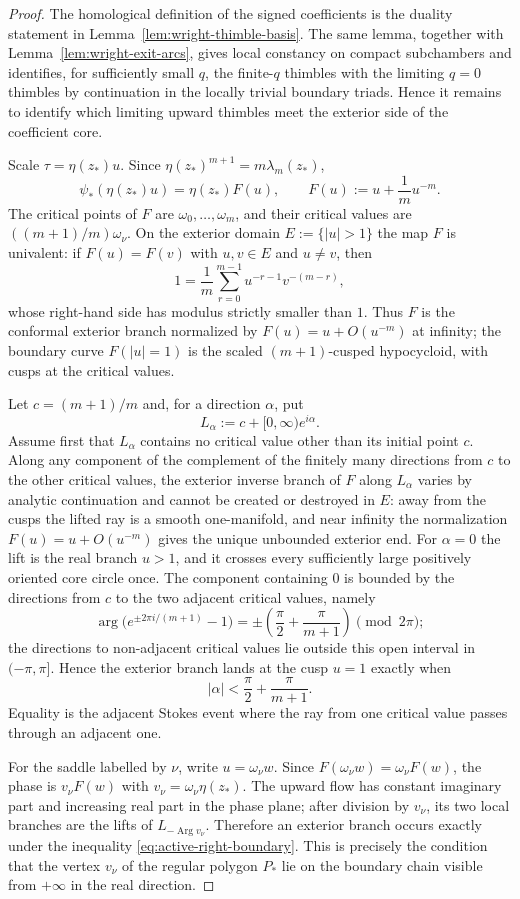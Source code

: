 \documentclass[reqno]{article}
\theoremstyle{definition}
\theoremstyle{remark}
\theoremstyle{plain}
\begin{document}
\begin{proof}
The homological definition of the signed coefficients is the duality statement in Lemma~\ref{lem:wright-thimble-basis}. The same lemma, together with Lemma~\ref{lem:wright-exit-arcs}, gives local constancy on compact subchambers and identifies, for sufficiently small $q$, the finite-$q$ thimbles with the limiting $q=0$ thimbles by continuation in the locally trivial boundary triads. Hence it remains to identify which limiting upward thimbles meet the exterior side of the coefficient core.

Scale $\tau=\eta(z_\ast)u$. Since $\eta(z_\ast)^{m+1}=m\lambda_m(z_\ast)$,
\[
\psi_\ast(\eta(z_\ast)u)=\eta(z_\ast)F(u),
\qquad
F(u):=u+\frac1m u^{-m}.
\]
The critical points of $F$ are $\omega_0,\ldots,\omega_m$, and their critical values are $((m+1)/m)\omega_\nu$. On the exterior domain $E:=\{|u|>1\}$ the map $F$ is univalent: if $F(u)=F(v)$ with $u,v\in E$ and $u\ne v$, then
\[
1=\frac1m\sum_{r=0}^{m-1}u^{-r-1}v^{-(m-r)},
\]
whose right-hand side has modulus strictly smaller than $1$. Thus $F$ is the conformal exterior branch normalized by $F(u)=u+O(u^{-m})$ at infinity; the boundary curve $F(|u|=1)$ is the scaled $(m+1)$-cusped hypocycloid, with cusps at the critical values.

Let $c=(m+1)/m$ and, for a direction $\alpha$, put
\[
L_\alpha:=c+[0,\infty)e^{i\alpha}.
\]
Assume first that $L_\alpha$ contains no critical value other than its initial point $c$. Along any component of the complement of the finitely many directions from $c$ to the other critical values, the exterior inverse branch of $F$ along $L_\alpha$ varies by analytic continuation and cannot be created or destroyed in $E$: away from the cusps the lifted ray is a smooth one-manifold, and near infinity the normalization $F(u)=u+O(u^{-m})$ gives the unique unbounded exterior end. For $\alpha=0$ the lift is the real branch $u>1$, and it crosses every sufficiently large positively oriented core circle once. The component containing $0$ is bounded by the directions from $c$ to the two adjacent critical values, namely
\[
\arg\bigl(e^{\pm2\pi i/(m+1)}-1\bigr)
=\pm\left(\frac\pi2+\frac\pi{m+1}\right)\pmod{2\pi};
\]
the directions to non-adjacent critical values lie outside this open interval in $(-\pi,\pi]$. Hence the exterior branch lands at the cusp $u=1$ exactly when
\[
|\alpha|<\frac\pi2+\frac\pi{m+1}.
\]
Equality is the adjacent Stokes event where the ray from one critical value passes through an adjacent one.

For the saddle labelled by $\nu$, write $u=\omega_\nu w$. Since $F(\omega_\nu w)=\omega_\nu F(w)$, the phase is $v_\nu F(w)$ with $v_\nu=\omega_\nu\eta(z_\ast)$. The upward flow has constant imaginary part and increasing real part in the phase plane; after division by $v_\nu$, its two local branches are the lifts of $L_{-\operatorname{Arg}v_\nu}$. Therefore an exterior branch occurs exactly under the inequality \eqref{eq:active-right-boundary}. This is precisely the condition that the vertex $v_\nu$ of the regular polygon $P_\ast$ lie on the boundary chain visible from $+\infty$ in the real direction.


\end{proof}
\end{document}
